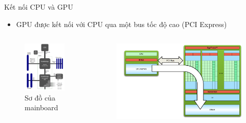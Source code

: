 \documentclass[10pt]{beamer}
\theoremstyle{remark}
\numberwithin{algocf}{section}
\numberwithin{equation}{section}
\numberwithin{dl}{section}
\numberwithin{figure}{section}
\begin{document}
\begin{frame}{Kết nối CPU và GPU}
    \begin{itemize}
        \item GPU được kết nối với CPU qua một bus tốc độ cao (PCI Express)
    \end{itemize}
    \begin{columns}[onlytextwidth]
        \begin{column}{0.35\linewidth}
            \begin{figure}[H]
                \centering
                \includegraphics[width=\linewidth]{figures/CUDA/Mainboard.png}
                \caption{Sơ đồ của mainboard}
            \end{figure}
        \end{column}
        \begin{column}{0.65\linewidth}
            \begin{figure}[H]
                \centering
                \includegraphics[width=\linewidth]{figures/CUDA/PCIe.png}

\end{figure}
\end{column}
\end{columns}
\end{frame}
\end{document}
